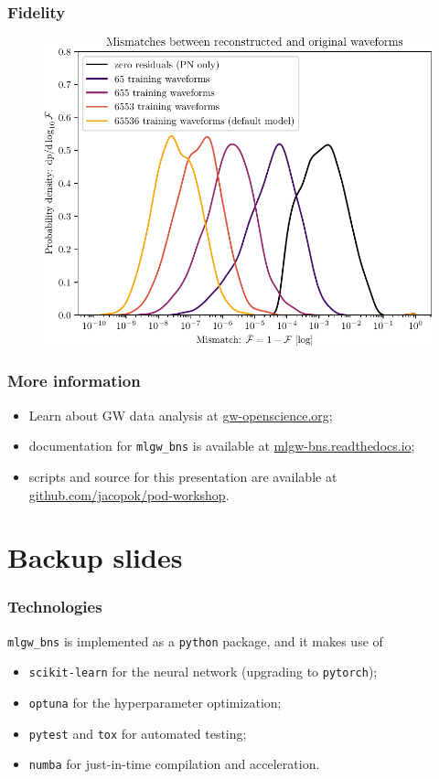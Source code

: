 \documentclass{beamer}
\begin{document}
\begin{frame}
    \frametitle{Fidelity}
    \begin{figure}[ht]
    \centering
    \includegraphics[width=.85\textwidth]{figures/mismatches_by_n_train}
    \end{figure}
\end{frame}

\begin{frame}
    \frametitle{More information}
    \begin{itemize}
        \item Learn about GW data analysis at \url{gw-openscience.org};
        \item documentation for \texttt{mlgw\_bns} is available at \url{mlgw-bns.readthedocs.io};
        \item scripts and source for this presentation are available at \url{github.com/jacopok/pod-workshop}.
    \end{itemize}
\end{frame}

\section{Backup slides}

\begin{frame}
    \frametitle{Technologies}
    \texttt{mlgw\_bns} is implemented as a \texttt{python} package, and it makes use of 
    \begin{itemize}
        \item \texttt{scikit-learn} for the neural network (upgrading to \texttt{pytorch});
        \item \texttt{optuna} for the hyperparameter optimization;
        \item \texttt{pytest} and \texttt{tox} for automated testing;
        \item \texttt{numba} for just-in-time compilation and acceleration.
    \end{itemize}
\end{frame}
\end{document}
